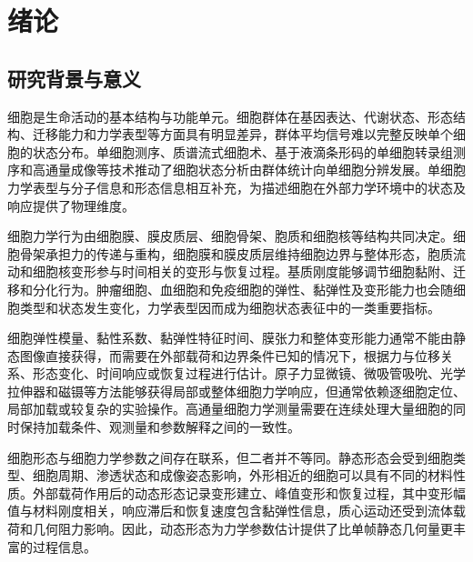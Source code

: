 \chapter{绪论}
\label{cha:chap01}

\section{研究背景与意义}

细胞是生命活动的基本结构与功能单元。细胞群体在基因表达、代谢状态、形态结构、迁移能力和力学表型等方面具有明显差异，群体平均信号难以完整反映单个细胞的状态分布。单细胞测序、质谱流式细胞术、基于液滴条形码的单细胞转录组测序和高通量成像等技术推动了细胞状态分析由群体统计向单细胞分辨发展\cite{altschuler2010heterogeneity,trapnell2015singlecell,shapiro2013singlecell,bendall2011singlecellmass,macosko2015dropseq,klein2015dropletbarcoding,heath2016singlecelltools,regev2017humancellatlas}。单细胞力学表型与分子信息和形态信息相互补充，为描述细胞在外部力学环境中的状态及响应提供了物理维度。

细胞力学行为由细胞膜、膜皮质层、细胞骨架、胞质和细胞核等结构共同决定。细胞骨架承担力的传递与重构，细胞膜和膜皮质层维持细胞边界与整体形态，胞质流动和细胞核变形参与时间相关的变形与恢复过程\cite{kasza2007cellmaterial,fletcher2010cellmechanics,wang2009mechanotransduction,moeendarbary2013poroelastic}。基质刚度能够调节细胞黏附、迁移和分化行为\cite{discher2005tissue,engler2006matrix}。肿瘤细胞、血细胞和免疫细胞的弹性、黏弹性及变形能力也会随细胞类型和状态发生变化，力学表型因而成为细胞状态表征中的一类重要指标\cite{suresh2007cancer,dicarlo2012mechanical,toepfner2018morphorheological}。

细胞弹性模量、黏性系数、黏弹性特征时间、膜张力和整体变形能力通常不能由静态图像直接获得，而需要在外部载荷和边界条件已知的情况下，根据力与位移关系、形态变化、时间响应或恢复过程进行估计。原子力显微镜、微吸管吸吮、光学拉伸器和磁镊等方法能够获得局部或整体细胞力学响应，但通常依赖逐细胞定位、局部加载或较复杂的实验操作。高通量细胞力学测量需要在连续处理大量细胞的同时保持加载条件、观测量和参数解释之间的一致性\cite{darling2015high,dicarlo2012mechanical,urbanska2020comparison}。

细胞形态与细胞力学参数之间存在联系，但二者并不等同。静态形态会受到细胞类型、细胞周期、渗透状态和成像姿态影响，外形相近的细胞可以具有不同的材料性质。外部载荷作用后的动态形态记录变形建立、峰值变形和恢复过程，其中变形幅值与材料刚度相关，响应滞后和恢复速度包含黏弹性信息，质心运动还受到流体载荷和几何阻力影响\cite{mietke2015rtdc,mokbel2017rtdc,dudani2016viscoelastic,gong2024prediction}。因此，动态形态为力学参数估计提供了比单帧静态几何量更丰富的过程信息。

